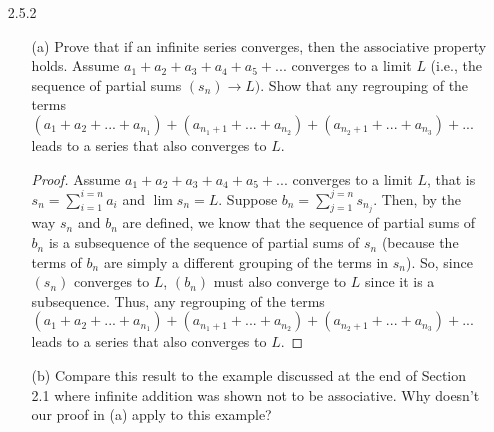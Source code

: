 \documentclass[12pt,letterpaper]{article}
\begin{document}
\begin{itemize}[leftmargin=!,labelindent=5pt]
\begin{itemize}
\begin{proof}
                    Next, we prove that if $\lim a_n$ exists, then $\lim \inf a_n = \lim \sup a_n$.
                    Assume $\lim a_n$ exists.
                    Let $\epsilon > 0$ be arbitrary.
                    Then, there exists an $N \in \mathbb{N}$ such that for all $n \geq N$, $\abs{a_n - L} < \epsilon$.
                    Since every element after $a_n$ must be within the bounds $L-\epsilon$ and $L + \epsilon$, it follows that $\inf a_n$ and $\sup a_n$ must exist within these bounds as well. 
                    Then, $L-\epsilon \leq \lim\inf a_n \leq L + \epsilon$ and $L-\epsilon \leq \lim\sup a_n \leq L + \epsilon$.
                    Thus, since $\epsilon$ is arbitrary, we get that $\lim\inf a_n = L = \lim\sup a_n$.
                \end{proof}
        \end{itemize}
    \item [2.5.2]
        \begin{itemize}
            \item [(a)] Prove that if an infinite series converges, then the associative property holds. Assume $a_1 + a_2 + a_3 + a_4 + a_5 +...$ converges to a limit $L$ (i.e., the sequence of partial sums $(s_n) \to L)$. Show that any regrouping of the terms $(a_1 +a_2 +...+a_{n_1})+(a_{n_1+1} +...+a_{n_2})+(a_{n_2+1} +...+a_{n_3})+...$ leads to a series that also converges to $L$.
                \begin{proof}
                    Assume $a_1 + a_2 + a_3 + a_4 + a_5 +...$ converges to a limit $L$, that is $s_n = \sum_{i=1}^{i=n} a_i$ and $\lim s_n = L$.
                    Suppose $b_n = \sum_{j=1}^{j=n} s_{n_j}$.
                    Then, by the way $s_n$ and $b_n$ are defined, we know that the sequence of partial sums of $b_n$ is a subsequence of the sequence of partial sums of $s_n$ (because the terms of $b_n$ are simply a different grouping of the terms in $s_n$).
                    So, since $(s_n)$ converges to $L$, $(b_n)$ must also converge to $L$ since it is a subsequence.
                    Thus, any regrouping of the terms $(a_1 +a_2 +...+ a_{n_1}) +(a_{n_1+1} +...+ a_{n_2}) + (a_{n_2+1} +...+a_{n_3})+...$ leads to a series that also converges to $L$.
                \end{proof}
            \item [(b)] Compare this result to the example discussed at the end of Section 2.1 where infinite addition was shown not to be associative. Why doesn’t our proof in (a) apply to this example?
            

\end{itemize}
\end{itemize}
\end{document}
